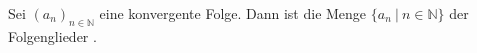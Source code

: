 Sei $(a_n)_{n \in \mathbb{N}}$ eine konvergente Folge. Dann ist die Menge $\{a_n \ | \ n \in \mathbb{N}\}$ der Folgenglieder .